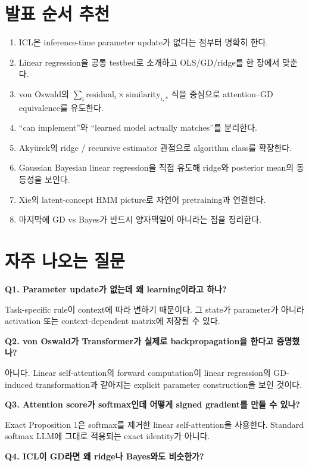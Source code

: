\documentclass[11pt,a4paper,oneside,openany]{memoir}
\theoremstyle{definition}
\begin{document}
\section{발표 순서 추천}

\begin{enumerate}
\item ICL은 inference-time parameter update가 없다는 점부터 명확히 한다.
\item Linear regression을 공통 testbed로 소개하고 OLS/GD/ridge를 한 장에서 맞춘다.
\item von Oswald의 $\sum_i \text{residual}_i\times\text{similarity}_{i,*}$ 식을 중심으로 attention--GD equivalence를 유도한다.
\item ``can implement''와 ``learned model actually matches''를 분리한다.
\item Akyürek의 ridge / recursive estimator 관점으로 algorithm class를 확장한다.
\item Gaussian Bayesian linear regression을 직접 유도해 ridge와 posterior mean의 동등성을 보인다.
\item Xie의 latent-concept HMM picture로 자연어 pretraining과 연결한다.
\item 마지막에 GD vs Bayes가 반드시 양자택일이 아니라는 점을 정리한다.
\end{enumerate}

\section{자주 나오는 질문}

\textbf{Q1. Parameter update가 없는데 왜 learning이라고 하나?}

Task-specific rule이 context에 따라 변하기 때문이다. 그 state가 parameter가 아니라 activation 또는 context-dependent matrix에 저장될 수 있다.

\textbf{Q2. von Oswald가 Transformer가 실제로 backpropagation을 한다고 증명했나?}

아니다. Linear self-attention의 forward computation이 linear regression의 GD-induced transformation과 같아지는 explicit parameter construction을 보인 것이다.

\textbf{Q3. Attention score가 softmax인데 어떻게 signed gradient를 만들 수 있나?}

Exact Proposition 1은 softmax를 제거한 linear self-attention을 사용한다. Standard softmax LLM에 그대로 적용되는 exact identity가 아니다.

\textbf{Q4. ICL이 GD라면 왜 ridge나 Bayes와도 비슷한가?}
\end{document}

